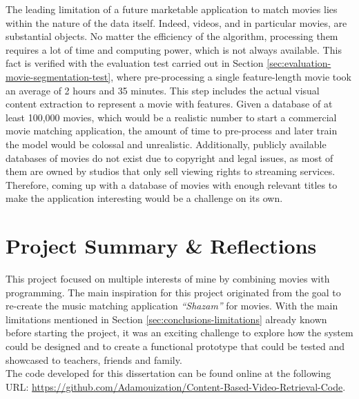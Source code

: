 The leading limitation of a future marketable application to match movies lies within the nature of the data itself. Indeed, videos, and in particular movies, are substantial objects. No matter the efficiency of the algorithm, processing them requires a lot of time and computing power, which is not always available. This fact is verified with the evaluation test carried out in Section \ref{sec:evaluation-movie-segmentation-test}, where pre-processing a single feature-length movie took an average of 2 hours and 35 minutes. This step includes the actual visual content extraction to represent a movie with features. Given a database of at least 100,000 movies, which would be a realistic number to start a commercial movie matching application, the amount of time to pre-process and later train the model would be colossal and unrealistic. Additionally, publicly available databases of movies do not exist due to copyright and legal issues, as most of them are owned by studios that only sell viewing rights to streaming services. Therefore, coming up with a database of movies with enough relevant titles to make the application interesting would be a challenge on its own.
    

\section{Project Summary \& Reflections}

This project focused on multiple interests of mine by combining movies with programming. The main inspiration for this project originated from the goal to re-create the music matching application \textit{``Shazam''} for movies. With the main limitations mentioned in Section \ref{sec:conclusions-limitations} already known before starting the project, it was an exciting challenge to explore how the system could be designed and to create a functional prototype that could be tested and showcased to teachers, friends and family.\\

The code developed for this dissertation can be found online at the following URL: \url{https://github.com/Adamouization/Content-Based-Video-Retrieval-Code}.